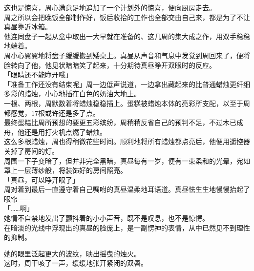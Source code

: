 这也是惊喜，周心满意足地追加了一个计划外的惊喜，便向厨房走去。\\

周之所以会把晚饭全部制作好，饭后收拾的工作也全部交由自己来，都是为了不让真昼靠近冰箱。\\

他连同盘子一起从盒中取出一大早就在准备的、这几周的集大成之作，用双手稳稳地端着。\\

周小心翼翼地将盘子缓缓搬到矮桌上。真昼从声音和气息中发觉到周回来了，便将脸转向了他，他见状暗暗笑了起来，十分期待真昼睁开双眼时的反应。\\

「眼睛还不能睁开哦」\\

「准备工作还没有结束呢」周一边低声说道，一边拿出藏起来的比普通蜡烛更纤细多彩的蜡烛，小心地插在白色的奶油大地上。\\

一根、两根，周默数着将蜡烛稳稳插上。蛋糕被蜡烛本体的亮彩所支配，以至于周都感觉，17根或许还是多了点。\\

最终蛋糕比周所预想的要更五彩缤纷，周稍稍反省自己的预判不足，不过木已成舟，他还是用打火机点燃了蜡烛。\\

这么多根蜡烛，周也得稍微花些时间。顺利地将所有蜡烛都点亮后，他便用遥控器关掉了房间的灯。\\

周围一下子变暗了，但并非完全黑暗，真昼每有一岁，便有一束柔和的光晕，宛如罩上一层薄纱般，将装饰好的房间照亮。\\

「真昼，可以睁开眼了」\\

周对着到最后一直遵守着自己嘱咐的真昼温柔地耳语道。真昼怯生生地慢慢抬起了眼帘——\\

「……啊」\\

她情不自禁地发出了颤抖着的小小声音，既不是叹息，也不是惊愕。\\

在暗淡的光线中浮现出的真昼的脸庞上，是一副愣神的表情，从中已然见不到理性的抑制。

她的眼里泛起更大的波纹，映出摇曳的烛火。\\

这时，周干咳了一声，缓缓地张开紧闭的双唇。\\

